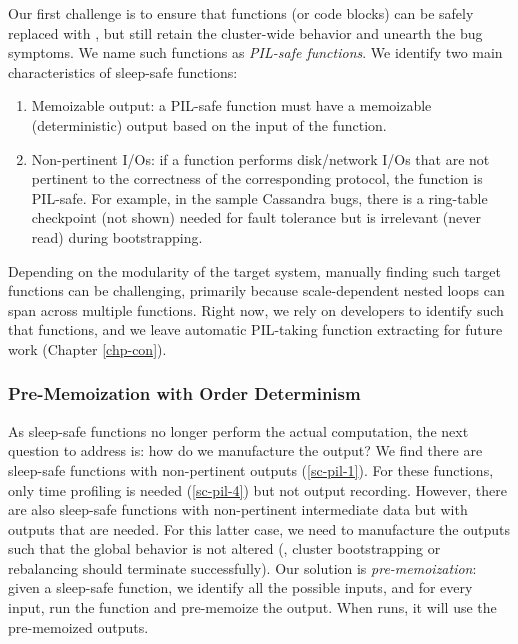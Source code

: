 Our first challenge is to ensure that functions (or code blocks) can be safely
replaced with \sleep, but still retain the cluster-wide behavior and unearth the
bug symptoms.  We name such functions as {\em PIL-safe functions}.
%
We identify two main characteristics of sleep-safe functions:
\begin{enumerate}
\item Memoizable output: a PIL-safe function must have a memoizable
(deterministic) output based on the input of the function.
\item Non-pertinent I/Os: if a function performs disk/network I/Os that are not
pertinent to the correctness of the corresponding protocol, the function is
PIL-safe.  For example, in the sample Cassandra bugs, there is a ring-table
checkpoint (not shown) needed for fault tolerance but is irrelevant (never read)
during bootstrapping.
%
\end{enumerate}
Depending on the modularity of the target system, manually finding such target
functions can be challenging, primarily because scale-dependent nested loops can
span across multiple functions. Right now, we rely on developers to identify
such that functions, and we leave automatic PIL-taking function extracting for
future work (Chapter \ref{chp-con}).

\subsubsection{Pre-Memoization with Order Determinism}
\label{sc-pil-3}

As sleep-safe functions no longer perform the actual computation, the next
question to address is: how do we manufacture the output?  We find there
are sleep-safe functions with non-pertinent outputs
(\sec\ref{sc-pil-1}). For these functions, only time profiling is needed
(\sec\ref{sc-pil-4}) but not output recording.  However, there are also
sleep-safe functions with non-pertinent intermediate data but with outputs
that are needed.
%
For this latter case, we need to manufacture the outputs such that the
global behavior is not altered (\eg, cluster bootstrapping or rebalancing
should terminate successfully).
%
Our solution is {\em pre-memoization}: given a sleep-safe
function, we identify all the possible inputs, and for every input, run
the function and pre-memoize the output.  
When \sck runs, it will use the pre-memoized outputs.


